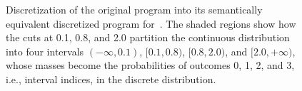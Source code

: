 \begin{figure}[t]
{\begin{tikzpicture}[scale=1.1]
  \end{tikzpicture}
  }
  \caption{Discretization of the original program into its semantically equivalent discretized program for~. The shaded regions show how the cuts at 0.1, 0.8, and 2.0 partition the continuous distribution into four intervals $(-\infty, 0.1)$, $[0.1, 0.8)$, $[0.8, 2.0)$, and $[2.0, +\infty)$, whose masses become the probabilities of outcomes 0, 1, 2, and 3, i.e., interval indices, in the discrete distribution.}
  \label{fig:cuts-gaussian}
\end{figure}
